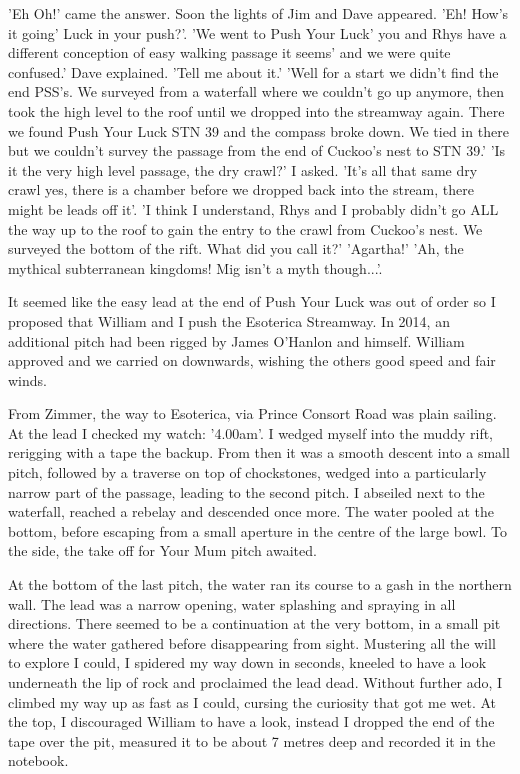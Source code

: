 \documentclass[onecolumn]{book}
\begin{document}
 'Eh Oh!' came the answer. Soon the lights of Jim and Dave appeared. 'Eh! How's it going' Luck in your push?'. 
'We went to Push Your Luck'  you and Rhys have a different conception of easy walking passage it seems' and we were quite confused.' Dave explained.
'Tell me about it.'
'Well for a start we didn't find the end PSS's. We surveyed from a waterfall where we couldn't go up anymore, then took the high level to the roof until we dropped into the streamway again. There we found Push Your Luck STN 39 and the compass broke down. We tied in there but we couldn't survey the passage from the end of Cuckoo's nest to STN 39.'
 'Is it the very high level passage, the dry crawl?' I asked. 
'It's all that same dry crawl yes, there is a chamber before we dropped back into the stream, there might be leads off it'. 
'I think I understand, Rhys and I probably didn't go ALL the way up to the roof to gain the entry to the crawl from Cuckoo's nest. We surveyed the bottom of the rift. What did you call it?'
'Agartha!'
'Ah, the mythical subterranean kingdoms! Mig isn't a myth though...'.

It seemed like the easy lead at the end of Push Your Luck was out of order so I proposed that William and I push the Esoterica Streamway. In 2014, an additional pitch had been rigged by James O'Hanlon and himself. William approved and we carried on downwards, wishing the others good speed and fair winds. 

From Zimmer, the way to Esoterica, via Prince Consort Road was plain sailing. At the lead I checked my watch: '4.00am'. I wedged myself into the muddy rift, rerigging with a tape the backup. From then it was a smooth descent into a small pitch, followed by a traverse on top of chockstones, wedged into a particularly narrow part of the passage, leading to the second pitch. I abseiled next to the waterfall, reached a rebelay and descended once more. The water pooled at the bottom, before escaping from a small aperture in the centre of the large bowl. To the side, the take off for Your Mum pitch awaited. 

At the bottom of the last pitch, the water ran its course to a gash in the northern wall. The lead was a narrow opening, water splashing and spraying in all directions. There seemed to be a continuation at the very bottom, in a small pit where the water gathered before disappearing from sight. Mustering all the will to explore I could, I spidered my way down in seconds, kneeled to have a look underneath the lip of rock and proclaimed the lead dead. Without further ado, I climbed my way up as fast as I could, cursing the curiosity that got me wet. At the top, I discouraged William to have a look, instead I dropped the end of the tape over the pit, measured it to be about 7 metres deep and recorded it in the notebook. 
\end{document}
